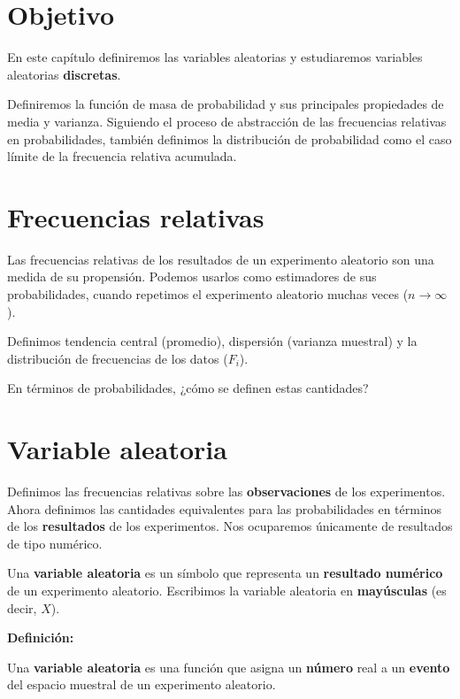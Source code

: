 \documentclass[
]{book}
\begin{document}
\hypertarget{objetivo-1}{%
\section{Objetivo}\label{objetivo-1}}

En este capítulo definiremos las variables aleatorias y estudiaremos variables aleatorias \textbf{discretas}.

Definiremos la función de masa de probabilidad y sus principales propiedades de media y varianza. Siguiendo el proceso de abstracción de las frecuencias relativas en probabilidades, también definimos la distribución de probabilidad como el caso límite de la frecuencia relativa acumulada.

\hypertarget{frecuencias-relativas-2}{%
\section{Frecuencias relativas}\label{frecuencias-relativas-2}}

Las frecuencias relativas de los resultados de un experimento aleatorio son una medida de su propensión. Podemos usarlos como estimadores de sus probabilidades, cuando repetimos el experimento aleatorio muchas veces (\(n \rightarrow \infty\)).

Definimos tendencia central (promedio), dispersión (varianza muestral) y la distribución de frecuencias de los datos (\(F_i\)).

En términos de probabilidades, ¿cómo se definen estas cantidades?

\hypertarget{variable-aleatoria}{%
\section{Variable aleatoria}\label{variable-aleatoria}}

Definimos las frecuencias relativas sobre las \textbf{observaciones} de los experimentos. Ahora definimos las cantidades equivalentes para las probabilidades en términos de los \textbf{resultados} de los experimentos. Nos ocuparemos únicamente de resultados de tipo numérico.

Una \textbf{variable aleatoria} es un símbolo que representa un \textbf{resultado numérico} de un experimento aleatorio. Escribimos la variable aleatoria en \textbf{mayúsculas} (es decir, \(X\)).

\textbf{Definición:}

Una \textbf{variable aleatoria} es una función que asigna un \textbf{número} real a un \textbf{evento} del espacio muestral de un experimento aleatorio.
\end{document}
